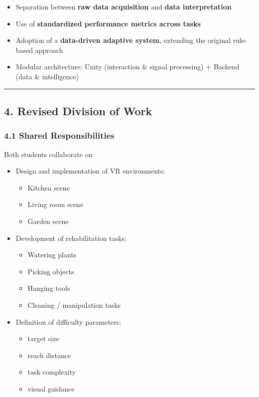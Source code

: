 \documentclass[11pt]{article}
\begin{document}
\begin{itemize}
\item Separation between \textbf{raw data acquisition} and \textbf{data interpretation}
\item Use of \textbf{standardized performance metrics across tasks}
\item Adoption of a \textbf{data-driven adaptive system}, extending the original rule-based approach
\item Modular architecture: Unity (interaction \& signal processing) + Backend (data \& intelligence)
\end{itemize}

\hrule


\subsection*{4. Revised Division of Work}


\subsubsection*{4.1 Shared Responsibilities}


Both students collaborate on:


\begin{itemize}
\item Design and implementation of VR environments:
\begin{itemize}
\item Kitchen scene
\item Living room scene
\item Garden scene
\end{itemize}
\end{itemize}

\begin{itemize}
\item Development of rehabilitation tasks:
\begin{itemize}
\item Watering plants
\item Picking objects
\item Hanging tools
\item Cleaning / manipulation tasks
\end{itemize}
\end{itemize}

\begin{itemize}
\item Definition of difficulty parameters:
\begin{itemize}
\item target size
\item reach distance
\item task complexity
\item visual guidance
\end{itemize}
\end{itemize}
\end{document}
